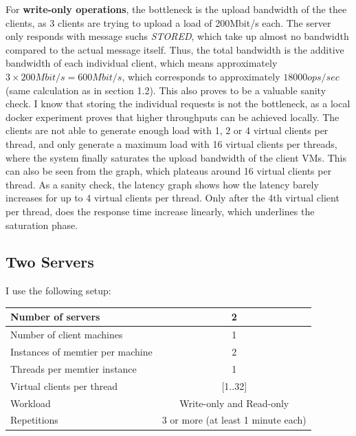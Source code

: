 \documentclass[11pt,a4paper]{article}
\begin{document}
For \textbf{write-only operations}, the bottleneck is the upload bandwidth of the thee clients,
as 3 clients are trying to upload a load of 200Mbit/s each.
The server only responds with message suchs \textit{STORED}, which take up almost no bandwidth compared to the actual message itself.
Thus, the total bandwidth is the additive bandwidth of each individual client, which means approximately $ 3 \times 200 Mbit/s = 600 Mbit/s $, which corresponds to approximately $18000 ops/sec $ (same calculation as in section 1.2). 
This also proves to be a valuable sanity check.
I know that storing the individual requests is not the bottleneck, as a local docker experiment proves that higher throughputs can be achieved locally.
The clients are not able to generate enough load with 1, 2 or 4 virtual clients per thread, and only generate a maximum load with 16 virtual clients per threads, where the system finally saturates the upload bandwidth of the client VMs.
This can also be seen from the graph, which plateaus around 16 virtual clients per thread.
As a sanity check, the latency graph shows how the latency barely increases for up to 4 virtual clients per thread.
Only after the 4th virtual client per thread, does the response time increase linearly, which underlines the saturation phase.

\subsection{Two Servers}

I use the following setup:

\begin{center}
	\scriptsize{
		\begin{tabular}{|l|c|}
			\hline Number of servers                & 2                        \\ 
			\hline Number of client machines        & 1                        \\ 
			\hline Instances of memtier per machine & 2                        \\ 
			\hline Threads per memtier instance     & 1                        \\
			\hline Virtual clients per thread       & [1..32]                  \\ 
			\hline Workload                         & Write-only and Read-only \\
			\hline Repetitions                      & 3 or more (at least 1 minute each)                \\ 
			\hline 
		\end{tabular}
	} 
\end{center}
\end{document}
